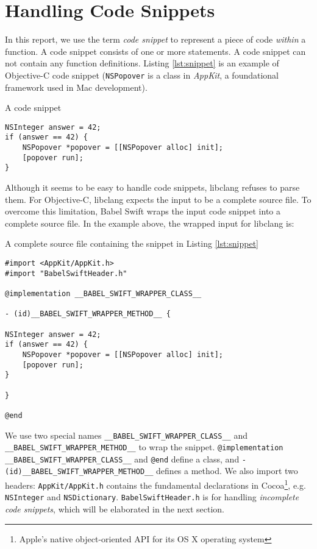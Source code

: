 \documentclass{sfuthesis}
\begin{document}
\section{Handling Code Snippets}

In this report, we use the term \emph{code snippet} to represent a piece of code \emph{within} a function. A code snippet consists of one or more statements. A code snippet can not contain any function definitions. Listing \ref{lst:snippet} is an example of Objective-C code snippet (\texttt{NSPopover} is a class in \emph{AppKit}, a foundational framework used in Mac development).

\begin{listing}
\caption{A code snippet}
\label{lst:snippet}
\begin{verbatim}
NSInteger answer = 42;
if (answer == 42) {
    NSPopover *popover = [[NSPopover alloc] init];
    [popover run];
}
\end{verbatim}
\end{listing}

Although it seems to be easy to handle code snippets, libclang refuses to parse them. For Objective-C, libclang expects the input to be a complete source file. To overcome this limitation, Babel Swift wraps the input code snippet into a complete source file. In the example above, the wrapped input for libclang is:

\begin{listing}
\caption{A complete source file containing the snippet in Listing \ref{lst:snippet}}	
\label{lst:wrappedsnippet}
\begin{verbatim}
#import <AppKit/AppKit.h>
#import "BabelSwiftHeader.h"

@implementation __BABEL_SWIFT_WRAPPER_CLASS__

- (id)__BABEL_SWIFT_WRAPPER_METHOD__ {

NSInteger answer = 42;
if (answer == 42) {
    NSPopover *popover = [[NSPopover alloc] init];
    [popover run];
}

}

@end
\end{verbatim}
\end{listing}

We use two special names \texttt{\_\_BABEL\_SWIFT\_WRAPPER\_CLASS\_\_} and \texttt{\_\_BABEL\_\-SWIFT\_\-WRAPPER\_\-METHOD\_\_} to wrap the snippet. \texttt{@implementation \_\_BABEL\_SWIFT\_\-WRAPPER\_\-CLASS\_\_} and \texttt{@end} define a class, and \texttt{- (id)\_\_BABEL\_SWIFT\_WRAPPER\_METHOD\_\_} defines a method. We also import two headers: \texttt{AppKit/AppKit.h} contains the fundamental declarations in Cocoa\footnote{Apple's native object-oriented API for its OS X operating system}, e.g. \texttt{NSInteger} and \texttt{NSDictionary}. \texttt{BabelSwiftHeader.h} is for handling \emph{incomplete code snippets}, which will be elaborated in the next section.
\end{document}
